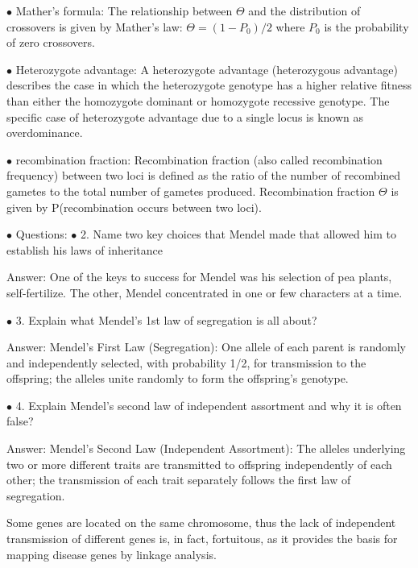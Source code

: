 \documentclass{article}
\begin{document}
\vspace{0.1in}
$\bullet$ Mather's formula:
The relationship between $\Theta $ and the distribution of crossovers is given by
Mather’s law: $\Theta = (1 - P_0)/2 $
where $P_0$ is the probability of zero crossovers.


\vspace{0.1in}
$\bullet$ Heterozygote advantage:
A heterozygote advantage (heterozygous advantage) describes the case in which the heterozygote genotype has a higher relative fitness than either the homozygote dominant or homozygote recessive genotype. The specific case of heterozygote advantage due to a single locus is known as overdominance.

\vspace{0.1in}
$\bullet$ recombination fraction:
Recombination fraction (also called recombination frequency) between two loci
is defined as the ratio of the number of recombined gametes to the total number
of gametes produced.
Recombination fraction $\Theta $ is given by P(recombination occurs between two loci).


\vspace{2pc}
$\bullet$ Questions:
$\bullet$ 2. Name two key choices that Mendel made that allowed him to establish his
laws of inheritance

Answer:
One of the keys to success for Mendel was his selection of pea plants, self-fertilize. 
The other, Mendel concentrated in one or few characters at a time.


\vspace{0.1in}
$\bullet$ 3. Explain what Mendel's 1st law of segregation is all about?

Answer: Mendel’s First Law (Segregation): One allele of each parent is randomly and independently selected, with probability 1/2, for transmission to the offspring; the alleles unite randomly to form the offspring’s genotype.


\vspace{0.1in} 
$\bullet$ 4. Explain Mendel's second law of independent assortment and why it is often false?

Answer: Mendel’s Second Law (Independent Assortment): The alleles underlying two or
more different traits are transmitted to offspring independently of each other; the
transmission of each trait separately follows the first law of segregation.

Some genes are located on the same chromosome, thus the lack of independent transmission of different genes is, in fact, fortuitous, as it provides the basis for mapping disease genes by linkage analysis.
\end{document}
